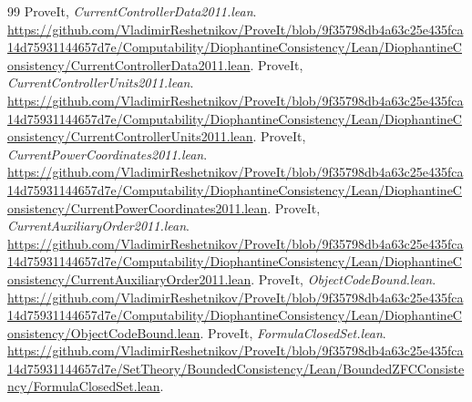 \documentclass[11pt,letterpaper]{article}
\begin{document}
\begin{thebibliography}{99}
 ProveIt, \emph{CurrentControllerData2011.lean}. \url{https://github.com/VladimirReshetnikov/ProveIt/blob/9f35798db4a63c25e435fca14d75931144657d7e/Computability/DiophantineConsistency/Lean/DiophantineConsistency/CurrentControllerData2011.lean}.
 ProveIt, \emph{CurrentControllerUnits2011.lean}. \url{https://github.com/VladimirReshetnikov/ProveIt/blob/9f35798db4a63c25e435fca14d75931144657d7e/Computability/DiophantineConsistency/Lean/DiophantineConsistency/CurrentControllerUnits2011.lean}.
 ProveIt, \emph{CurrentPowerCoordinates2011.lean}. \url{https://github.com/VladimirReshetnikov/ProveIt/blob/9f35798db4a63c25e435fca14d75931144657d7e/Computability/DiophantineConsistency/Lean/DiophantineConsistency/CurrentPowerCoordinates2011.lean}.
 ProveIt, \emph{CurrentAuxiliaryOrder2011.lean}. \url{https://github.com/VladimirReshetnikov/ProveIt/blob/9f35798db4a63c25e435fca14d75931144657d7e/Computability/DiophantineConsistency/Lean/DiophantineConsistency/CurrentAuxiliaryOrder2011.lean}.
 ProveIt, \emph{ObjectCodeBound.lean}. \url{https://github.com/VladimirReshetnikov/ProveIt/blob/9f35798db4a63c25e435fca14d75931144657d7e/Computability/DiophantineConsistency/Lean/DiophantineConsistency/ObjectCodeBound.lean}.
 ProveIt, \emph{FormulaClosedSet.lean}. \url{https://github.com/VladimirReshetnikov/ProveIt/blob/9f35798db4a63c25e435fca14d75931144657d7e/SetTheory/BoundedConsistency/Lean/BoundedZFCConsistency/FormulaClosedSet.lean}.
\end{thebibliography}
\end{document}
